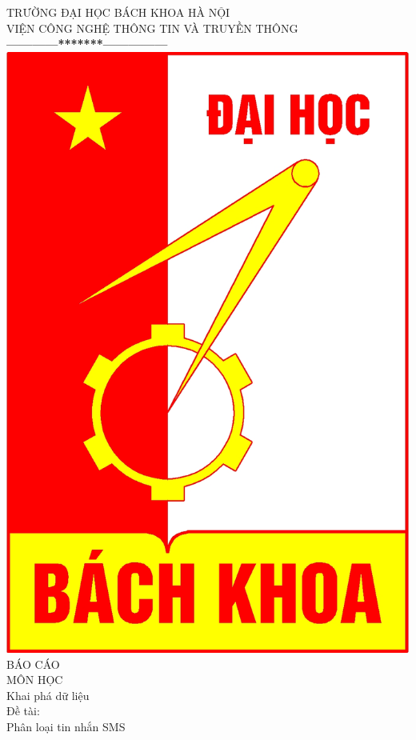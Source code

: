 \documentclass[a4paper,11pt]{report}
\begin{document}
\thispagestyle{empty}
\thisfancypage{
\setlength{\fboxrule}{1pt}
\doublebox}{}
\begin{center}
{\fontsize{16}{19}\selectfont TRƯỜNG ĐẠI HỌC BÁCH KHOA HÀ NỘI\\
VIỆN CÔNG NGHỆ THÔNG TIN VÀ TRUYỀN THÔNG}\\
\textbf{------------*******---------------}\\[1cm]
\includegraphics[scale=0.13]{hust.jpg}\\[1.3cm]

{\fontsize{32}{43}\selectfont BÁO CÁO}\\[0.1cm]
{\fontsize{38}{45}\selectfont MÔN HỌC}\\[0.2cm]
{\fontsize{19}{20}\selectfont Khai phá dữ liệu}\\[1cm]
{\fontsize{17}{24}\selectfont Đề tài:}\\[1cm]
{\fontsize{17}{24}\selectfont Phân loại tin nhắn SMS}\\[1.5cm]
\end{center}
\end{document}

